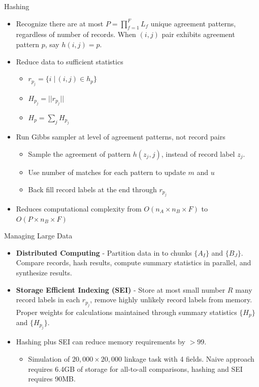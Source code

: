 \documentclass{beamer}
\begin{document}
\begin{frame}{Hashing}
	\begin{itemize}
		\item Recognize there are at most $P = \prod_{f = 1}^F L_f$ unique agreement patterns, regardless of number of records. When $(i,j)$ pair exhibits agreement pattern $p$, say $h(i, j)=p.$
		
		\item Reduce data to sufficient statistics
		\begin{itemize}
		\item $r_{p_j} = \{i \;|\, (i, j) \in h_p\}$
		\item $H_{p_j} = ||r_{p_j}||$
		\item $H_p = \sum_{j} H_{p_j}$
		\end{itemize}
		
		\item Run Gibbs sampler at level of agreement patterns, not record pairs
		\begin{itemize}
		\item Sample the agreement of pattern $h(z_j, j)$, instead of record label $z_j$.
		\item Use number of matches for each pattern to update $m$ and $u$
		\item Back fill record labels at the end through $r_{p_j}$
	\end{itemize}

		\item Reduces computational complexity from $O(n_A \times n_B \times F)$ to $O(P \times n_B \times F)$
	\end{itemize}
\end{frame}

\begin{frame}{Managing Large Data}
	\begin{itemize}
		\item \textbf{Distributed Computing} - Partition data in to chunks $\{A_I\}$ and $\{B_J\}$. Compare records, hash results, compute summary statistics in parallel, and synthesize results.
		
		\item \textbf{Storage Efficient Indexing (SEI)} - Store at most small number $R$ many record labels in each $r_{p_j}$, remove highly unlikely record labels from memory. Proper weights for calculations maintained through summary statistics $\{H_p\}$ and $\{H_{p_j}\}$.
		
		\item Hashing plus SEI can reduce memory requirements by $>99$.
		\begin{itemize}
			\item Simulation of $20,000 \times 20,000$ linkage task with 4 fields. Naive approach requires 6.4GB of storage for all-to-all comparisons, hashing and SEI requires 90MB.
		\end{itemize}
	\end{itemize}
\end{frame}
\end{document}
